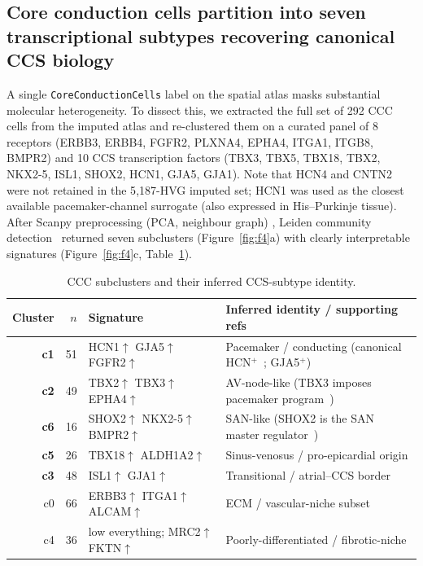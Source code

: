 \documentclass[11pt,a4paper]{article}
\begin{document}
\subsection{Core conduction cells partition into seven transcriptional
subtypes recovering canonical CCS biology}
\label{sec:heterogeneity}

A single \texttt{CoreConductionCells} label on the spatial atlas masks
substantial molecular heterogeneity. To dissect this, we extracted the
full set of 292 CCC cells from the imputed atlas and re-clustered them
on a curated panel of 8 receptors (ERBB3, ERBB4, FGFR2, PLXNA4, EPHA4,
ITGA1, ITGB8, BMPR2) and 10 CCS transcription factors (TBX3, TBX5,
TBX18, TBX2, NKX2-5, ISL1, SHOX2, HCN1, GJA5, GJA1). Note that HCN4 and
CNTN2 were not retained in the 5{,}187-HVG imputed set; HCN1 was used
as the closest available pacemaker-channel surrogate (also expressed
in His--Purkinje tissue). After Scanpy preprocessing (PCA, neighbour
graph) \citep{wolf2018scanpy}, Leiden community
detection~\citep{traag2019leiden} returned seven subclusters
(Figure~\ref{fig:f4}a) with clearly interpretable
signatures (Figure~\ref{fig:f4}c, Table~\ref{tab:ccc-subtypes}).

\begin{table}[H]
\centering
\caption{CCC subclusters and their inferred CCS-subtype identity.}
\label{tab:ccc-subtypes}
\small
\begin{tabular}{rrlp{6.4cm}}
\toprule
Cluster & $n$ & Signature & Inferred identity / supporting refs \\
\midrule
\textbf{c1} & 51 & HCN1$\uparrow$ GJA5$\uparrow$ FGFR2$\uparrow$ &
Pacemaker / conducting (canonical
HCN$^+$~\citep{difrancesco2010funny}; GJA5$^+$) \\
\textbf{c2} & 49 & TBX2$\uparrow$ TBX3$\uparrow$ EPHA4$\uparrow$ &
AV-node-like (TBX3 imposes pacemaker
program~\citep{hoogaars2007tbx3}) \\
\textbf{c6} & 16 & SHOX2$\uparrow$ NKX2-5$\uparrow$ BMPR2$\uparrow$ &
SAN-like (SHOX2 is the SAN master
regulator~\citep{espinozalewis2009shox2,blaschke2007shox2}) \\
\textbf{c5} & 26 & TBX18$\uparrow$ ALDH1A2$\uparrow$ &
Sinus-venosus / pro-epicardial origin
\citep{christoffels2006tbx18,wiese2009tbx18tbx3} \\
\textbf{c3} & 48 & ISL1$\uparrow$ GJA1$\uparrow$ &
Transitional / atrial--CCS border \\
c0 & 66 & ERBB3$\uparrow$ ITGA1$\uparrow$ ALCAM$\uparrow$ &
ECM / vascular-niche subset \\
c4 & 36 & low everything; MRC2$\uparrow$ FKTN$\uparrow$ &
Poorly-differentiated / fibrotic-niche \\
\bottomrule
\end{tabular}
\end{table}
\end{document}
